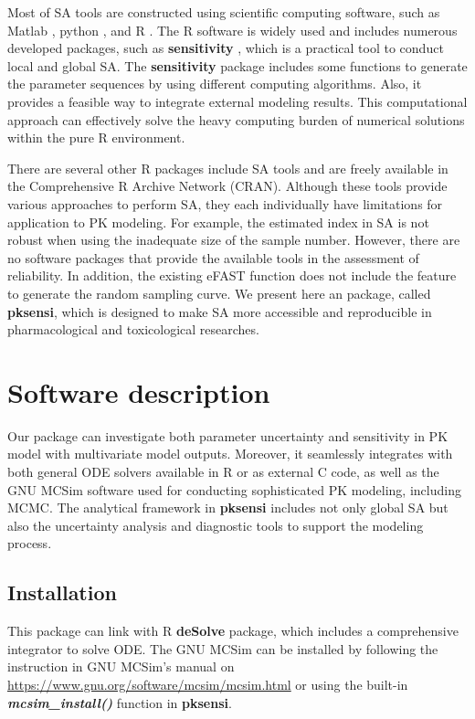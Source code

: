 \documentclass[preprint,12pt, a4paper]{elsarticle}
\begin{document}
Most of SA tools are constructed using scientific computing software, 
such as Matlab \cite{pianosi2015matlab},
python \cite{herman2017salib}, and R \cite{iooss2017introduction}. 
The R software is widely used and includes numerous developed packages,
such as \textbf{sensitivity} \cite{R-sensitivity}, 
which is a practical tool to conduct local and
global SA. The \textbf{sensitivity} package includes some functions to
generate the parameter sequences by using different computing
algorithms. Also, it provides a feasible way to integrate external
modeling results. This computational approach can effectively solve the
heavy computing burden of numerical solutions within the pure R
environment. 

There are several other R packages include SA tools and
are freely available in the Comprehensive R Archive Network (CRAN). Although these tools provide various approaches to perform SA, they each
individually have limitations for application to PK modeling. For
example, the estimated index in SA is not robust when using the
inadequate size of the sample number. However, there are no software
packages that provide the available tools in the assessment of
reliability. In addition, the existing eFAST function does not include
the feature to generate the random sampling curve. We present here an
package, called \textbf{pksensi}, which is designed to make SA more
accessible and reproducible in pharmacological and toxicological
researches. 

\section{Software description}

Our package can investigate both parameter uncertainty and
sensitivity in PK model with multivariate model outputs. Moreover, it
seamlessly integrates with both general ODE solvers available in R or as
external C code, as well as the GNU MCSim software used for conducting
sophisticated PK modeling, including MCMC. The analytical framework in
\textbf{pksensi} includes not only global SA but also the uncertainty
analysis and diagnostic tools to support the modeling process.

\subsection{Installation}

This package can link with R \textbf{deSolve} package,
which includes a comprehensive integrator to solve ODE. The GNU MCSim
can be installed by following the instruction in GNU MCSim's manual on
\url{https://www.gnu.org/software/mcsim/mcsim.html} or using the
built-in \textbf{\textit{mcsim\_install()}} function in \textbf{pksensi}.
\end{document}

